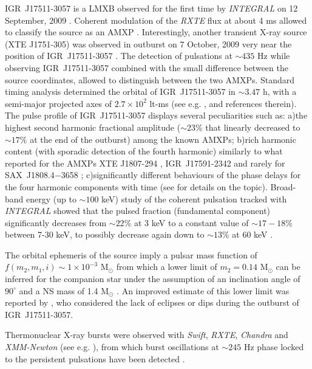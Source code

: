 \documentclass[graybox]{svmult}
\def \inte {{\em INTEGRAL\xspace}}
\def \swift {{\em Swift\xspace}}
\def \chandra {{\em Chandra\xspace}}
\def \xmm {{\em XMM-Newton\xspace}}
\def \rxte {{\em RXTE\xspace}}
\def \saxj{{\rm SAX~J1808.4$-$3658\xspace}}
\begin{document}
IGR~J17511-3057 is a LMXB observed for the first time by \inte{} on 12 September, 2009 \cite{Baldovin2009}. Coherent modulation of the \rxte{} flux at about 4 ms allowed to classify the source as an AMXP \cite{Markwardt2010}. Interestingly, another transient X-ray source (XTE J1751-305) was observed in outburst on 7 October, 2009 very near the position of IGR~J17511-3057 \cite{Chenevez2009,Falanga2011}. The detection of pulsations at $\sim 435$ Hz \cite{Markwardt2010} while observing IGR~J17511-3057 combined with the small difference between the source coordinates, allowed to distinguish between the two AMXPs.
Standard timing analysis determined the orbital of IGR~J17511-3057 in $\sim3.47$ h, with a semi-major projected axes of $2.7\times 10^2$ lt-ms (see e.g. \cite{Riggio2011}, and references therein). The pulse profile of IGR~J17511-3057 displays several peculiarities such as: a)the highest second harmonic fractional amplitude ($\sim23\%$ that linearly decreased to $\sim17\%$ at the end of the outburst) among the known AMXPs; b)rich harmonic content (with sporadic detection of the fourth harmonic) similarly to what reported for the AMXPs XTE J1807-294 \cite{Patruno2010b}, IGR~J17591-2342 \cite{Sanna2018c} and rarely for \saxj{} \cite{Hartman2008}; c)significantly different behaviours of the phase delays for the four harmonic components with time (see \cite{Riggio2011} for details on the topic). Broad-band energy (up to $\sim100$ keV) study of the coherent pulsation tracked with \inte{} showed that the pulsed fraction (fundamental component) significantly decreases from $\sim22$\% at 3 keV to a constant value of $\sim17-18$\% between 7-30 keV, to possibly decrease again down to $\sim13$\% at 60 keV \cite{Falanga2011}.

The orbital ephemeris of the source imply a pulsar mass function of $f(m_2,m_1,i) \sim 1\times10^{-3}$ M$_\odot$ from which a lower limit of $m_2=0.14$ M$_\odot$ can be inferred for the companion star under the assumption of an inclination angle of $90^\circ$ and a NS mass of 1.4 M$_\odot$ \cite{Markwardt2009}. An improved estimate of this lower limit was reported by \cite{Papitto2010}, who considered the lack of eclipses or dips during the outburst of IGR~J17511-3057.

Thermonuclear X-ray bursts were observed with \swift{}, \rxte{}, \chandra{} and \xmm{} (see e.g. \cite{Bozzo2010,Watts2009b,Novak2009, Papitto2010}), from which burst oscillations at $\sim245$ Hz phase locked to the persistent pulsations have been detected \cite{Watts2009b,Papitto2010,Altamirano2010c,Riggio2011}. 
\end{document}
